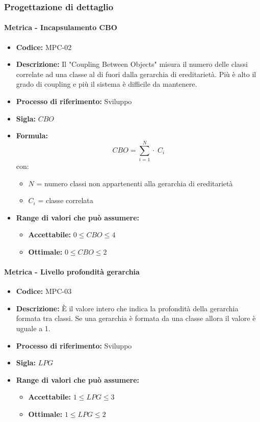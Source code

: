 \subsubsection{Progettazione di dettaglio}
    \paragraph{Metrica - Incapsulamento CBO}
    \begin{itemize}
        \item \textbf{Codice:} MPC-02
        \item \textbf{Descrizione:} Il "Coupling Between Objects" misura il numero delle classi correlate ad una classe al di fuori dalla gerarchia di ereditarietà. Più è alto il grado di coupling e più il sistema è difficile da mantenere.
        \item \textbf{Processo di riferimento:} Sviluppo
        \item \textbf{Sigla:} $CBO$
        \item \textbf{Formula:}$$CBO = {\sum_{i=1}^{N} \cdot \; C_i}$$
        con:
        \begin{itemize}
            \item $N$ = numero classi non appartenenti alla gerarchia di ereditarietà
            \item $C_i$ = classe correlata
        \end{itemize}
        \item \textbf{Range di valori che può assumere:}
        \begin{itemize}
            \item \textbf{Accettabile:} $0 \leq{} CBO \leq 4$
            \item \textbf{Ottimale:} $0 \leq{} CBO \leq 2$
        \end{itemize}
    \end{itemize}

    \paragraph{Metrica - Livello profondità gerarchia}
    \begin{itemize}
        \item \textbf{Codice:} MPC-03
        \item \textbf{Descrizione:} È il valore intero che indica la profondità della gerarchia formata tra classi. Se una gerarchia è formata da una classe allora il valore è uguale a 1.
        \item \textbf{Processo di riferimento:} Sviluppo
        \item \textbf{Sigla:} $LPG$
        \item \textbf{Range di valori che può assumere:}
        \begin{itemize}
            \item \textbf{Accettabile:} $1 \leq{} LPG \leq 3$
            \item \textbf{Ottimale:} $1 \leq{} LPG \leq 2$
        \end{itemize}
    \end{itemize}

